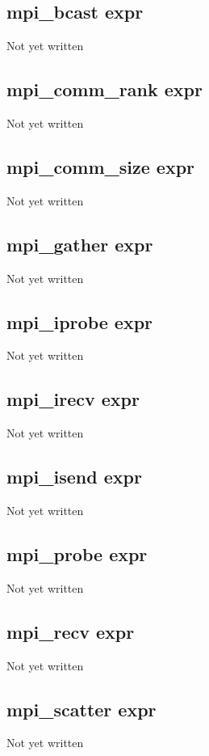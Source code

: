 \documentclass[a4paper,11pt]{article}
\begin{document}
{\subsection{\ttfamily mpi\_bcast expr}
   Not yet written

\subsection{\ttfamily mpi\_comm\_rank expr}
   Not yet written

\subsection{\ttfamily mpi\_comm\_size expr}
   Not yet written

\subsection{\ttfamily mpi\_gather expr}
   Not yet written

\subsection{\ttfamily mpi\_iprobe expr}
   Not yet written

\subsection{\ttfamily mpi\_irecv expr}
   Not yet written

\subsection{\ttfamily mpi\_isend expr}
   Not yet written

\subsection{\ttfamily mpi\_probe expr}
   Not yet written

\subsection{\ttfamily mpi\_recv expr}
   Not yet written

\subsection{\ttfamily mpi\_scatter expr}
   Not yet written

}
\end{document}
